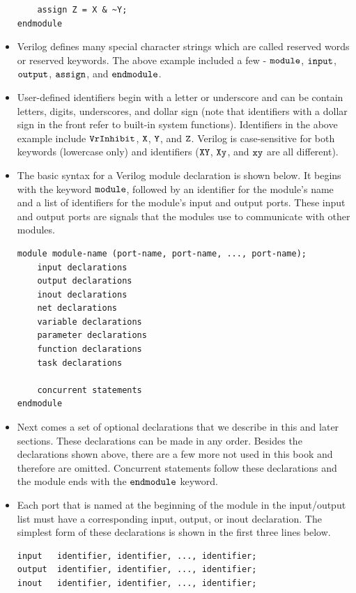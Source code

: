 \documentclass[10pt,a4paper]{article}
\begin{document}
\begin{itemize}
\begin{lstlisting}
	assign Z = X & ~Y;
endmodule
\end{lstlisting}
\item Verilog defines many special character strings which are called reserved words or reserved keywords. The above example included a few - $\tt{module}$, $\tt{input}$, $\tt{output}$, $\tt{assign}$, and $\tt{endmodule}$. 
\item User-defined identifiers begin with a letter or underscore and can be contain letters, digits, underscores, and dollar sign (note that identifiers with a dollar sign in the front refer to built-in system functions). Identifiers in the above example include $\tt{VrInhibit}$, $\tt{X}$, $\tt{Y}$, and $\tt{Z}$. Verilog is case-sensitive for both keywords (lowercase only) and identifiers ($\tt{XY}$, $\tt{Xy}$, and $\tt{xy}$ are all different). 
\item The basic syntax for a Verilog module declaration is shown below. It begins with the keyword $\tt{module}$, followed by an identifier for the module's name and a list of identifiers for the module's input and output ports. These input and output ports are signals that the modules use to communicate with other modules. 
\begin{lstlisting}
module module-name (port-name, port-name, ..., port-name);
	input declarations
	output declarations
	inout declarations
	net declarations
	variable declarations
	parameter declarations
	function declarations
	task declarations
	
	concurrent statements
endmodule
\end{lstlisting}
\item Next comes a set of optional declarations that we describe in this and later sections. These declarations can be made in any order. Besides the declarations shown above, there are a few more not used in this book and therefore are omitted. Concurrent statements follow these declarations and the module ends with the $\tt{endmodule}$ keyword.
\pagebreak 
\item Each port that is named at the beginning of the module in the input/output list must have a corresponding input, output, or inout declaration. The simplest form of these declarations is shown in the first three lines below. 
\begin{lstlisting}
input	identifier, identifier, ..., identifier;
output	identifier, identifier, ..., identifier;
inout	identifier, identifier, ..., identifier;


\end{lstlisting}
\end{itemize}
\end{document}
